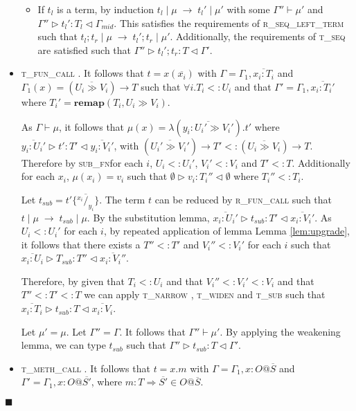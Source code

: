 \documentclass[preprint]{sigplanconf}
\newcommand{\lemref}[1]{Lemma \ref{#1}}
\newcommand{\rseqlt}{\textsc{r\_seq\_left\_term} }
\newcommand{\rfunc}{\textsc{r\_fun\_call} }
\newcommand{\tseq}{\textsc{t\_seq} }
\newcommand{\tfunc}{\textsc{t\_fun\_call} }
\newcommand{\tmethc}{\textsc{t\_meth\_call} }
\newcommand{\tsub}{\textsc{t\_sub} }
\newcommand{\tnarrow}{\textsc{t\_narrow} }
\newcommand{\twiden}{\textsc{t\_widen} }
\newcommand{\subfn}{\textsc{sub\_fn}}
\newcommand{\remapapp}[3]{\ensuremath{\mathbf{remap}(#1, #2 \gg #3)}}
\newcommand{\typerule}[4]{#1 \triangleright #2 : #3 \triangleleft #4}
\newcommand{\oprule}[4]{#1 \mid #2\;\longrightarrow\;#3 \mid #4}
\newcommand{\subst}[3]{#3 \{\overline{^{#1}/_{#2}}\}}
\newcommand{\funv}[4]{\lambda(\overline{#1 : #2 \gg #3}).#4}
\newcommand{\funt}[3]{(\overline{#1 \gg #2}) \rightarrow #3}
\newcommand{\qed}{$\blacksquare$}
\newenvironment{proof}{\vspace{1ex}\noindent{\bf Proof}\hspace{0.5em}}
  {\hfill\qed\vspace{1ex}}
\begin{document}
\begin{proof}
\begin{itemize}
\begin{itemize}
  \item If $t_l$ is a term, by induction $\oprule{t_l}{\mu}{t_l'}{\mu'}$
  with some $\Gamma'' \vdash \mu'$ and
  $\typerule{\Gamma''}{t_l'}{T_l}{\Gamma_{mid}}$.
  This satisfies the requirements of \rseqlt
  such that $\oprule{t_l ; t_r}{\mu}{t_l' ; t_r}{\mu'}$.
  Additionally, the requirements of \tseq are satisfied such that
  $\typerule{\Gamma''}{t_l'; t_r}{T}{\Gamma'}$.

  \end{itemize}

\item \tfunc. It follows that $t = x ( \overline{x_i} )$ with
$\Gamma = \Gamma_1, \overline{x_i : T_i}$ 
and $\Gamma_1(x) = \funt{U_i}{V_i}{T}$
such that $\forall i . T_i <: U_i$ 
and that $\Gamma' = \Gamma_1, \overline{x_i : T_i'}$
where $T_i' = \remapapp{T_i}{U_i}{V_i}$.

As $\Gamma \vdash \mu$, 
it follows that $\mu(x) = \funv{y_i}{U_i'}{V_i'}{t'}$
where $\typerule{\overline{y_i : U_i'}}{t'}{T'}{\overline{y_i : V_i'}}$,
with $\funt{U_i'}{V_i'}{T'} <: \funt{U_i}{V_i}{T}$. 
Therefore by \subfn for each $i$, $U_i <: U_i'$, $V_i' <: V_i$
and $T' <: T$.
Additionally for each $x_i$, $\mu(x_i) = v_i$ such that 
$\typerule{\emptyset}{v_i}{T_i''}{\emptyset}$ 
where $T_i'' <: T_i$.

Let $t_{sub} = \subst{x_i}{y_i}{t'}$.
The term $t$ can be reduced by \rfunc such that
$\oprule{t}{\mu}{t_{sub}}{\mu}$.
By the substitution lemma, 
$\typerule{\overline{x_i : U_i'}}{t_{sub}}{T'}{\overline{x_i : V_i'}}$.
As $U_i <: U_i'$ for each $i$, by repeated application of lemma 
\lemref{lem:upgrade}, it follows that
there exists a $T'' <: T'$ and $V_i'' <: V_i'$ for each $i$
such that 
$\typerule{\overline{x_i : U_i}}{T_{sub}}{T''}{\overline{x_i : V_i''}}$.

Therefore, by given that $T_i <: U_i$ and that $V_i'' <: V_i' <: V_i$
and that $T'' <: T' <: T$ we can apply \tnarrow, \twiden and \tsub
such that $\typerule{\overline{x_i : T_i}}{t_{sub}}{T}{\overline{x_i : V_i}}$.

Let $\mu' = \mu$. Let $\Gamma'' = \Gamma$. It follows that 
$\Gamma'' \vdash \mu'$. By applying the weakening lemma, we can type 
$t_{sub}$ such that $\typerule{\Gamma''}{t_{sub}}{T}{\Gamma'}$.

\item \tmethc. It follows that $t = x.m$ with
$\Gamma = \Gamma_1, x : O@\overline{S}$ and
$\Gamma' = \Gamma_1, x : O@\overline{S'}$, where
$m : T \Rightarrow \overline{S'} \in O@\overline{S}$.


\end{itemize}
\end{proof}
\end{document}
